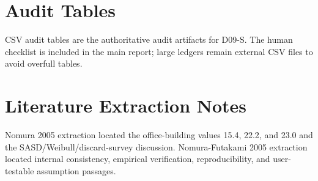 \documentclass[11pt]{article}
\begin{document}
\section{Audit Tables}
CSV audit tables are the authoritative audit artifacts for D09-S. The human checklist is included in the main report; large ledgers remain external CSV files to avoid overfull tables.
\section{Literature Extraction Notes}
Nomura 2005 extraction located the office-building values 15.4, 22.2, and 23.0 and the SASD/Weibull/discard-survey discussion. Nomura-Futakami 2005 extraction located internal consistency, empirical verification, reproducibility, and user-testable assumption passages.
\end{document}
